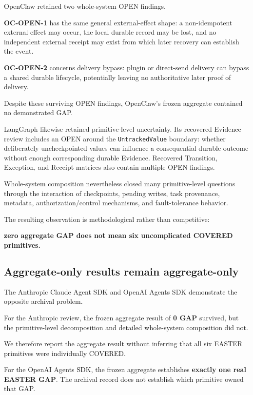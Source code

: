 \documentclass[11pt]{article}
\begin{document}
OpenClaw retained two whole-system OPEN findings.

\textbf{OC-OPEN-1} has the same general external-effect shape: a non-idempotent external effect may occur, the local durable record may be lost, and no independent external receipt may exist from which later recovery can establish the event.

\textbf{OC-OPEN-2} concerns delivery bypass: plugin or direct-send delivery can bypass a shared durable lifecycle, potentially leaving no authoritative later proof of delivery.

Despite these surviving OPEN findings, OpenClaw's frozen aggregate contained no demonstrated GAP.

LangGraph likewise retained primitive-level uncertainty. Its recovered Evidence review includes an OPEN around the \texttt{UntrackedValue} boundary: whether deliberately uncheckpointed values can influence a consequential durable outcome without enough corresponding durable Evidence. Recovered Transition, Exception, and Receipt matrices also contain multiple OPEN findings.

Whole-system composition nevertheless closed many primitive-level questions through the interaction of checkpoints, pending writes, task provenance, metadata, authorization/control mechanisms, and fault-tolerance behavior.

The resulting observation is methodological rather than competitive:

\textbf{zero aggregate GAP does not mean six uncomplicated COVERED primitives.}

\subsection{Aggregate-only results remain aggregate-only}

The Anthropic Claude Agent SDK and OpenAI Agents SDK demonstrate the opposite archival problem.

For the Anthropic review, the frozen aggregate result of \textbf{0 GAP} survived, but the primitive-level decomposition and detailed whole-system composition did not.

We therefore report the aggregate result without inferring that all six EASTER primitives were individually COVERED.

For the OpenAI Agents SDK, the frozen aggregate establishes \textbf{exactly one real EASTER GAP}. The archival record does not establish which primitive owned that GAP.
\end{document}
